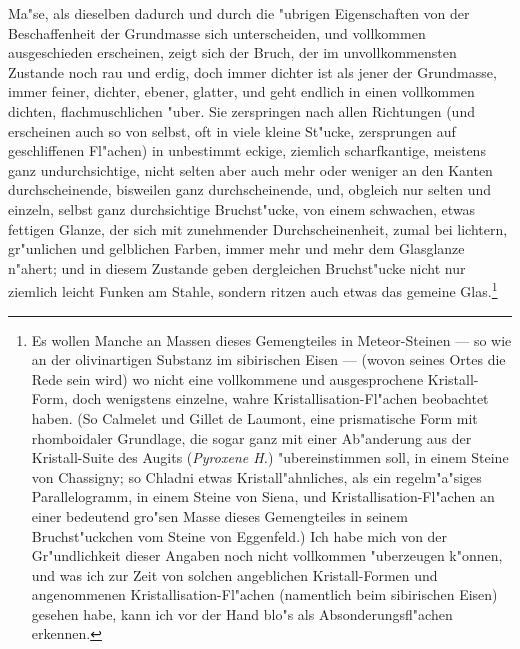 \documentclass[a4paper, 11pt, oneside, german]{article}
\begin{document}
Ma"se, als dieselben dadurch und durch die "ubrigen Eigenschaften von der Beschaffenheit der Grundmasse sich unterscheiden, und vollkommen ausgeschieden erscheinen, zeigt sich der Bruch, der im unvollkommensten Zustande noch rau und erdig, doch immer dichter ist als jener der Grundmasse, immer feiner, dichter, ebener, glatter, und geht endlich in einen vollkommen dichten, flachmuschlichen "uber. Sie zerspringen nach allen Richtungen (und erscheinen auch so von selbst, oft in viele kleine St"ucke, zersprungen auf geschliffenen Fl"achen) in unbestimmt eckige, ziemlich scharfkantige, meistens ganz undurchsichtige, nicht selten aber auch mehr oder weniger an den Kanten durchscheinende, bisweilen ganz durchscheinende, und, obgleich nur selten und einzeln, selbst ganz durchsichtige Bruchst"ucke, von einem schwachen, etwas fettigen Glanze, der sich mit zunehmender Durchscheinenheit, zumal bei lichtern, gr"unlichen und gelblichen Farben, immer mehr und mehr dem Glasglanze n"ahert; und in diesem Zustande geben dergleichen Bruchst"ucke nicht nur ziemlich leicht Funken am Stahle, sondern ritzen auch etwas das gemeine Glas.\footnote{Es wollen Manche an Massen dieses Gemengteiles in Meteor-Steinen --- so wie an der olivinartigen Substanz im sibirischen Eisen --- (wovon seines Ortes die Rede sein wird) wo nicht eine vollkommene und ausgesprochene Kristall-Form, doch wenigstens einzelne, wahre Kristallisation-Fl"achen beobachtet haben. (So Calmelet und Gillet de Laumont, eine prismatische Form mit rhomboidaler Grundlage, die sogar ganz mit einer Ab"anderung aus der Kristall-Suite des Augits (\emph{Pyroxene H.}) "ubereinstimmen soll, in einem Steine von Chassigny; so Chladni etwas Kristall"ahnliches, als ein regelm"a"siges Parallelogramm, in einem Steine von Siena, und Kristallisation-Fl"achen an einer bedeutend gro"sen Masse dieses Gemengteiles in seinem Bruchst"uckchen vom Steine von Eggenfeld.) Ich habe mich von der Gr"undlichkeit dieser Angaben noch nicht vollkommen "uberzeugen k"onnen, und was ich zur Zeit von solchen angeblichen Kristall-Formen und angenommenen Kristallisation-Fl"achen (namentlich beim sibirischen Eisen) gesehen habe, kann ich vor der Hand blo"s als Absonderungsfl"achen erkennen.}
\end{document}
